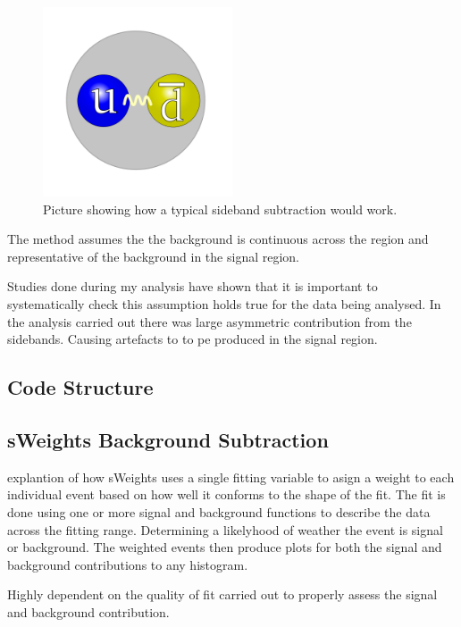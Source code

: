 \begin{figure}
	\centering
	\includegraphics[width=0.5\textwidth]{ImgChap1/meson2}
	\caption{Picture showing how a typical sideband subtraction would work.}		
	\label{sidebandsub}
\end{figure}

The method assumes the the background is continuous across the region and representative of the background in the signal region. 

Studies done during my analysis have shown that it is important to systematically check this assumption holds true for the data being analysed. In the analysis carried out there was large asymmetric contribution from the sidebands. Causing artefacts to to pe produced in the signal region.

\subsection{Code Structure}



\subsection{sWeights Background Subtraction}

explantion of how sWeights uses a single fitting variable to asign a weight to each individual event based on how well it conforms to the shape of the fit. The fit is done using one or more signal and background functions to describe the data across the fitting range. Determining a likelyhood of weather the event is signal or background. The weighted events then produce plots for both the signal and background contributions to any histogram.

Highly dependent on the quality of fit carried out to properly assess the signal and background contribution.

